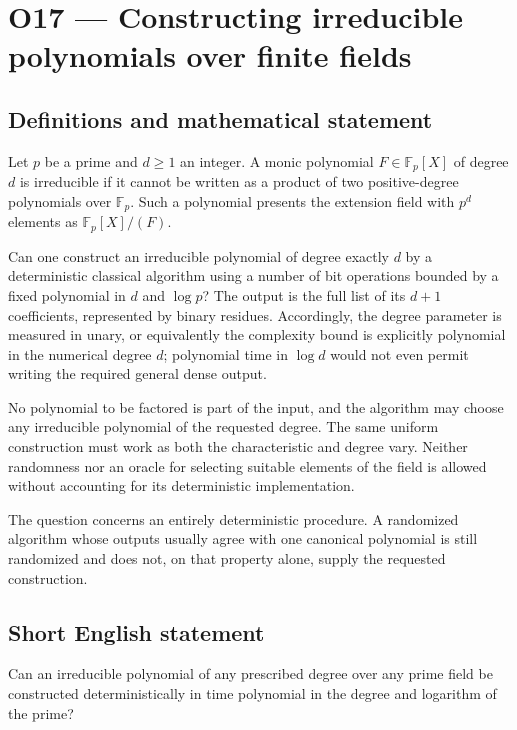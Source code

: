\documentclass[11pt,a4paper]{article}
\begin{document}
\section*{O17 — Constructing irreducible polynomials over finite fields}\label{statement}

\subsection{Definitions and mathematical statement}
Let $p$ be a prime and $d\ge1$ an integer. A monic polynomial $F\in\mathbb F_p[X]$ of degree $d$ is irreducible if it cannot be written as a product of two positive-degree polynomials over $\mathbb F_p$. Such a polynomial presents the extension field with $p^d$ elements as $\mathbb F_p[X]/(F)$.

Can one construct an irreducible polynomial of degree exactly $d$ by a deterministic classical algorithm using a number of bit operations bounded by a fixed polynomial in $d$ and $\log p$? The output is the full list of its $d+1$ coefficients, represented by binary residues. Accordingly, the degree parameter is measured in unary, or equivalently the complexity bound is explicitly polynomial in the numerical degree $d$; polynomial time in $\log d$ would not even permit writing the required general dense output.

No polynomial to be factored is part of the input, and the algorithm may choose any irreducible polynomial of the requested degree. The same uniform construction must work as both the characteristic and degree vary. Neither randomness nor an oracle for selecting suitable elements of the field is allowed without accounting for its deterministic implementation.

The question concerns an entirely deterministic procedure. A randomized algorithm whose outputs usually agree with one canonical polynomial is still randomized and does not, on that property alone, supply the requested construction.
\subsection{Short English statement}
Can an irreducible polynomial of any prescribed degree over any prime field be constructed deterministically in time polynomial in the degree and logarithm of the prime?
\end{document}
